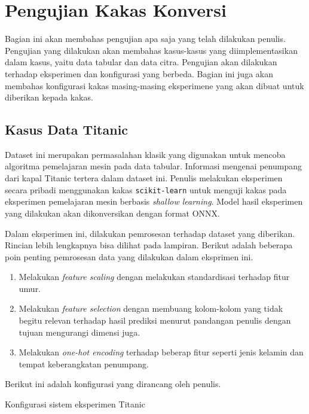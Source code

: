 \section{Pengujian Kakas Konversi}

Bagian ini akan membahas pengujian apa saja yang telah dilakukan penulis.
Pengujian yang dilakukan akan membahas kasus-kasus yang diimplementasikan dalam kasus, yaitu data tabular dan data citra.
Pengujian akan dilakukan terhadap eksperimen dan konfigurasi yang berbeda.
Bagian ini juga akan membahas konfigurasi kakas masing-masing eksperimene yang akan dibuat untuk diberikan kepada kakas.

\subsection{Kasus Data Titanic}

Dataset ini merupakan permasalahan klasik yang digunakan untuk mencoba algoritma pemelajaran mesin pada data tabular.
Informasi mengenai penumpang dari kapal Titanic tertera dalam dataset ini.
Penulis melakukan eksperimen secara pribadi menggunakan kakas \texttt{scikit-learn} untuk menguji kakas pada eksperimen pemelajaran mesin berbasis \textit{shallow learning}.
Model hasil eksperimen yang dilakukan akan dikonversikan dengan format ONNX.\@

Dalam eksperimen ini, dilakukan pemrosesan terhadap dataset yang diberikan.
Rincian lebih lengkapnya bisa dilihat pada lampiran.
Berikut adalah beberapa poin penting pemrosesan data yang dilakukan dalam eksprimen ini.

\begin{enumerate}
	\item Melakukan \textit{feature scaling} dengan melakukan standardisasi terhadap fitur umur.
	\item Melakukan \textit{feature selection} dengan membuang kolom-kolom yang tidak begitu relevan terhadap hasil prediksi menurut pandangan penulis dengan tujuan mengurangi dimensi juga.
	\item Melakukan \textit{one-hot encoding} terhadap beberap fitur seperti jenis kelamin dan tempat keberangkatan penumpang.
\end{enumerate}

Berikut ini adalah konfigurasi yang dirancang oleh penulis.

\begin{code}
	\caption{Konfigurasi sistem eksperimen Titanic}
	\label{listing:18}
\end{code}


